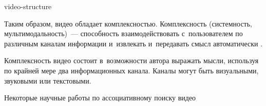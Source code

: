 \begin{figuredt}
    {video-structure}
\end{figuredt}

Таким образом, видео обладает комплексностью.
Комплексность (системность, мультимодальность)~— способность взаимодействовать
с~пользователем по различным каналам информации
и~извлекать и~передавать смысл автоматически \cite{Nigay:1993}.

Комплексность видео состоит в~возможности автора выражать мысли,
используя по крайней мере два информационных канала.
Каналы могут быть визуальными, звуковыми или текстовыми.


\begin{dtable}{Некоторые научные работы по ассоциативному поиску видео}

    \renewcommand{\arraystretch}{1.4}


\end{dtable}
